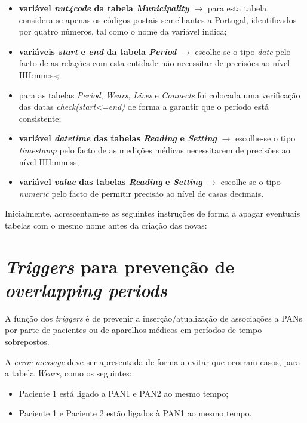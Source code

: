 \documentclass[a4paper]{article}
\begin{document}
\begin{itemize}
  \item \textbf{variável \textit{nut4code} da tabela \textit{Municipality}} $\rightarrow$ para esta tabela, considera-se apenas os códigos postais semelhantes a Portugal, identificados por quatro números, tal como o nome da variável indica;
  
  \item \textbf{variáveis \textit{start} e \textit{end} da tabela \textit{Period}} $\rightarrow$ escolhe-se o tipo \textit{date} pelo facto de as relações com esta entidade não necessitar de precisões ao nível HH:mm:ss;
  
  \item para as tabelas \textit{Period}, \textit{Wears}, \textit{Lives} e \textit{Connects} foi colocada uma verificação das datas \textit{check(start<=end)} de forma a garantir que o período está consistente;

  \item \textbf{variável \textit{datetime} das tabelas \textit{Reading} e \textit{Setting}} $\rightarrow$ escolhe-se o tipo \textit{timestamp} pelo facto de as medições médicas necessitarem de precisões ao nível HH:mm:ss;
  
  \item \textbf{variável \textit{value} das tabelas \textit{Reading} e \textit{Setting}} $\rightarrow$ escolhe-se o tipo \textit{numeric} pelo facto de permitir precisão ao nível de casas decimais.  
\end{itemize}
\pagebreak
Inicialmente, acrescentam-se as seguintes instruções de forma a apagar eventuais tabelas com o mesmo nome antes da criação das novas:



\section{\textit{Triggers} para prevenção de \textit{overlapping periods}}
A função dos \textit{triggers} é de prevenir a inserção/atualização de associações a PANs por parte de pacientes ou de aparelhos médicos em períodos de tempo sobrepostos. 

A \textit{error message} deve ser apresentada de forma a evitar que ocorram casos,  para a tabela \textit{Wears}, como os seguintes:
\vskip 5mm
\begin{itemize}
\item Paciente 1 está ligado a PAN1 e PAN2 ao mesmo tempo;

\item  Paciente 1 e Paciente 2 estão ligados à PAN1 ao mesmo tempo.
\end{itemize}
\end{document}
